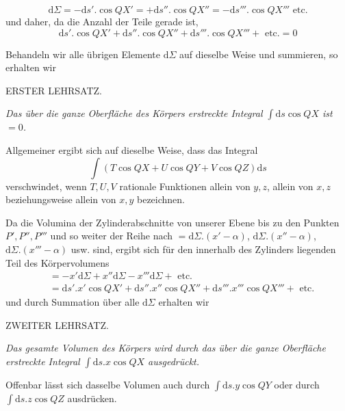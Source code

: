 \[
\mathrm{d}\Sigma=-\mathrm{d}s'.\cos QX'=+\mathrm{d}s''.\cos QX''=-\mathrm{d}s'''.\cos QX'''\text{ etc.}
\]
und daher, da die Anzahl der Teile gerade ist,
\[
\mathrm{d}s'.\cos QX'+\mathrm{d}s''.\cos QX''+\mathrm{d}s'''.\cos QX'''+\text{ etc.}=0
\]
\par
Behandeln wir alle übrigen Elemente $\mathrm{d}\Sigma$ auf dieselbe Weise und summieren, so erhalten wir
\par\medskip{}
\begin{center}ERSTER LEHRSATZ.\end{center}
\par
\textit{Das über die ganze Oberfläche des Körpers erstreckte Integral $\int\mathrm{d}s\cos QX$ ist $=0$.}
\par
Allgemeiner ergibt sich auf dieselbe Weise, dass das Integral
\[
\int(T\cos QX+U\cos QY+V\cos QZ)\mathrm{d}s
\]
verschwindet, wenn $T,U,V$ rationale Funktionen allein von $y,z$, allein von $x,z$ beziehungsweise allein von $x,y$ bezeichnen.

\par
Da die Volumina der Zylinderabschnitte von unserer Ebene bis zu den Punkten $P',P'',P'''$ und so weiter der Reihe nach $=\mathrm{d}\Sigma.(x'-\alpha)$, $\mathrm{d}\Sigma.(x''-\alpha)$, $\mathrm{d}\Sigma.(x'''-\alpha)$ usw. sind, ergibt sich für den innerhalb des Zylinders liegenden Teil des Körpervolumens
\[
\begin{aligned}
&=-x'\mathrm{d}\Sigma+x''\mathrm{d}\Sigma-x'''\mathrm{d}\Sigma+\text{ etc.}\\
&=\mathrm{d}s'.x'\cos QX'+\mathrm{d}s''.x''\cos QX''+\mathrm{d}s'''.x'''\cos QX'''+\text{ etc.}
\end{aligned}
\]
und durch Summation über alle $\mathrm{d}\Sigma$ erhalten wir
\par\medskip{}
\begin{center}ZWEITER LEHRSATZ.\end{center}
\par
\textit{Das gesamte Volumen des Körpers wird durch das über die ganze Oberfläche erstreckte Integral $\int\mathrm{d}s.x\cos QX$ ausgedrückt.}
\par
Offenbar lässt sich dasselbe Volumen auch durch $\int\mathrm{d}s.y\cos QY$ oder durch $\int\mathrm{d}s.z\cos QZ$ ausdrücken.


